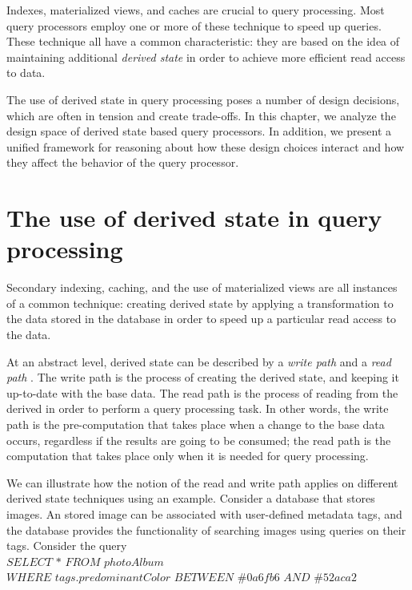 Indexes, materialized views, and caches are crucial to query processing.
Most query processors employ one or more of these technique to speed up queries.
These technique all have a common characteristic:
they are based on the idea of maintaining additional \textit{derived state} in order to achieve more efficient read
access to data.

The use of derived state in query processing poses a number of design decisions,
which are often in tension and create trade-offs.
In this chapter, we analyze the design space of derived state based query processors.
In addition, we present a unified framework for reasoning about how these design choices interact
and how they affect the behavior of the query processor.


\section{The use of derived state in query processing}

Secondary indexing, caching, and the use of materialized views are all instances of a common technique:
creating derived state by applying a transformation to the data stored in the database in order to speed up a particular
read access to the data.

At an abstract level, derived state can be described by a \textit{write path} and a \textit{read path}
\cite{kleppmann:designing}.
The write path is the process of creating the derived state, and keeping it up-to-date with the base data.
The read path is the process of reading from the derived in order to perform a query processing task.
In other words, the write path is the pre-computation that takes place when a change to the base data occurs,
regardless if the results are going to be consumed;
the read path is the computation that takes place only when it is needed for query processing.

\medskip

We can illustrate how the notion of the read and write path applies on different derived state techniques using an example.
Consider a database that stores images.
An stored image can be associated with user-defined metadata tags, and the database provides the functionality of searching
images using queries on their tags.
Consider the query \\

\noindent
$SELECT$ $*$ $FROM$ $photoAlbum$ \\
$WHERE$ $tags.predominantColor$ $BETWEEN$ $\#0a6fb6$ $AND$ $\#52aca2$ \\

